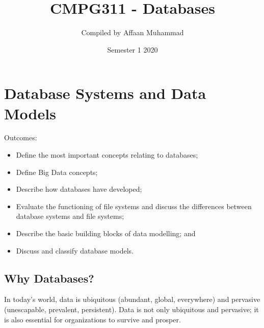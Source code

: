 \documentclass[a4paper, 12pt, titlepage]{report}
\begin{document}
\linespread{1.5}
\title{CMPG311 - Databases}
\author{Compiled by Affaan Muhammad}
\date{Semester 1 2020}
\maketitle
\tableofcontents{}

\chapter{Database Systems and Data Models}
Outcomes:
\begin{itemize}
\item Define the most important concepts relating to databases;
\item Define Big Data concepts;
\item Describe how databases have developed;
\item Evaluate the functioning of file systems and discuss the differences between database systems and file systems;
\item Describe the basic building blocks of data modelling; and
\item Discuss and classify database models.
\end{itemize}
\section{Why Databases?}
In today’s world, data is ubiquitous (abundant, global, everywhere) and pervasive (unescapable, prevalent, persistent). Data is not only ubiquitous and pervasive; it is also essential for organizations to survive and prosper.
\end{document}
